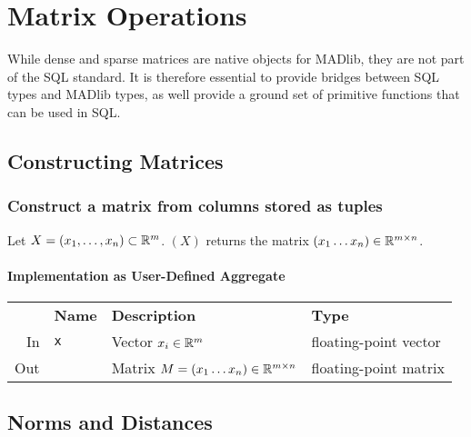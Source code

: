 
\chapter{Matrix Operations}

While dense and sparse matrices are native objects for MADlib, they are not part of the SQL standard. It is therefore essential to provide bridges between SQL types and MADlib types, as well provide a ground set of primitive functions that can be used in SQL.

\section{Constructing Matrices}

\subsection{Construct a matrix from columns stored as tuples} \label{sec:matrix:matrixAgg}

Let $X = ( x_1, \dots, x_n ) \subset \mathbb{R}^m$. $(X)$ returns the matrix $(x_1 \dots x_n) \in \mathbb{R}^{m \times n}$.

\subsubsection{Implementation as User-Defined Aggregate}

\begin{center}
	\begin{tabular}{rlll}
		\toprule%
		& \textbf{Name} & \textbf{Description} & \textbf{Type}
		\\\otoprule
		In &
		\texttt{x} &
		Vector $x_i \in \mathbb{R}^m$ &
		floating-point vector
		\\\midrule
		Out & &
		Matrix $M = (x_1 \dots x_n) \in \mathbb{R}^{m \times n}$ &
		floating-point matrix
		\\\bottomrule
	\end{tabular}
\end{center}


\section{Norms and Distances}

